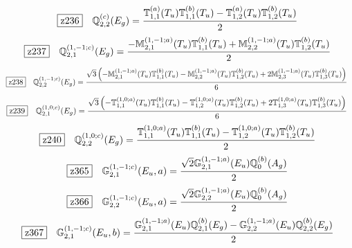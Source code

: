 \documentclass[fleqn,10pt,landscape]{jsarticle}
\begin{document}
\begin{dmath*}
\hspace*{3mm}\fbox{z236}\quad \mathbb{Q}_{2,2}^{(c)}(E_{g})=\frac{\mathbb{T}_{1,1}^{(a)}(T_{u}) \mathbb{T}_{1,1}^{(b)}(T_{u}) - \mathbb{T}_{1,2}^{(a)}(T_{u}) \mathbb{T}_{1,2}^{(b)}(T_{u})}{2}
\end{dmath*}
\begin{dmath*}
\hspace*{3mm}\fbox{z237}\quad \mathbb{Q}_{2,1}^{(1,-1;c)}(E_{g})=\frac{- \mathbb{M}_{2,1}^{(1,-1;a)}(T_{u}) \mathbb{T}_{1,1}^{(b)}(T_{u}) + \mathbb{M}_{2,2}^{(1,-1;a)}(T_{u}) \mathbb{T}_{1,2}^{(b)}(T_{u})}{2}
\end{dmath*}
\begin{dmath*}
\hspace*{3mm}\fbox{z238}\quad \mathbb{Q}_{2,2}^{(1,-1;c)}(E_{g})=\frac{\sqrt{3} \left(- \mathbb{M}_{2,1}^{(1,-1;a)}(T_{u}) \mathbb{T}_{1,1}^{(b)}(T_{u}) - \mathbb{M}_{2,2}^{(1,-1;a)}(T_{u}) \mathbb{T}_{1,2}^{(b)}(T_{u}) + 2 \mathbb{M}_{2,3}^{(1,-1;a)}(T_{u}) \mathbb{T}_{1,3}^{(b)}(T_{u})\right)}{6}
\end{dmath*}
\begin{dmath*}
\hspace*{3mm}\fbox{z239}\quad \mathbb{Q}_{2,1}^{(1,0;c)}(E_{g})=\frac{\sqrt{3} \left(- \mathbb{T}_{1,1}^{(1,0;a)}(T_{u}) \mathbb{T}_{1,1}^{(b)}(T_{u}) - \mathbb{T}_{1,2}^{(1,0;a)}(T_{u}) \mathbb{T}_{1,2}^{(b)}(T_{u}) + 2 \mathbb{T}_{1,3}^{(1,0;a)}(T_{u}) \mathbb{T}_{1,3}^{(b)}(T_{u})\right)}{6}
\end{dmath*}
\begin{dmath*}
\hspace*{3mm}\fbox{z240}\quad \mathbb{Q}_{2,2}^{(1,0;c)}(E_{g})=\frac{\mathbb{T}_{1,1}^{(1,0;a)}(T_{u}) \mathbb{T}_{1,1}^{(b)}(T_{u}) - \mathbb{T}_{1,2}^{(1,0;a)}(T_{u}) \mathbb{T}_{1,2}^{(b)}(T_{u})}{2}
\end{dmath*}
\begin{dmath*}
\hspace*{3mm}\fbox{z365}\quad \mathbb{G}_{2,1}^{(1,-1;c)}(E_{u},a)=\frac{\sqrt{2} \mathbb{G}_{2,1}^{(1,-1;a)}(E_{u}) \mathbb{Q}_{0}^{(b)}(A_{g})}{2}
\end{dmath*}
\begin{dmath*}
\hspace*{3mm}\fbox{z366}\quad \mathbb{G}_{2,2}^{(1,-1;c)}(E_{u},a)=\frac{\sqrt{2} \mathbb{G}_{2,2}^{(1,-1;a)}(E_{u}) \mathbb{Q}_{0}^{(b)}(A_{g})}{2}
\end{dmath*}
\begin{dmath*}
\hspace*{3mm}\fbox{z367}\quad \mathbb{G}_{2,1}^{(1,-1;c)}(E_{u},b)=\frac{\mathbb{G}_{2,1}^{(1,-1;a)}(E_{u}) \mathbb{Q}_{2,1}^{(b)}(E_{g}) - \mathbb{G}_{2,2}^{(1,-1;a)}(E_{u}) \mathbb{Q}_{2,2}^{(b)}(E_{g})}{2}
\end{dmath*}
\end{document}
